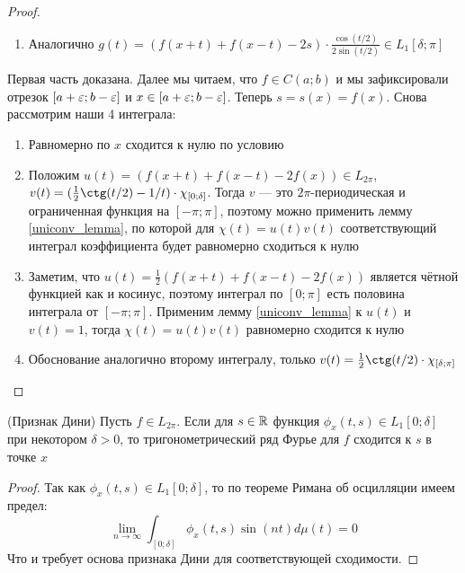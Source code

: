 \begin{proof}
\begin{enumerate}
 		\item Аналогично $g(t) = (f(x + t) + f(x - t) - 2s) \cdot \frac{\cos(t / 2)}{2\sin(t / 2)} \in L_1[\delta; \pi]$
 	\end{enumerate}
    Первая часть доказана. Далее мы читаем, что $f \in C(a; b)$ и мы зафиксировали отрезок $[a + \varepsilon; b - \varepsilon]$ и $x \in [a + \varepsilon; b - \varepsilon]$. Теперь $s = s(x) = f(x)$. Снова рассмотрим наши 4 интеграла:
    
    \begin{enumerate}
    	\item Равномерно по $x$ сходится к нулю по условию
    	
    	\item Положим $u(t) = (f(x + t) + f(x - t) - 2f(x)) \in L_{2\pi}$, $v(t) = (\frac{1}{2}\ctg(t / 2) - 1 / t) \cdot \chi_{[0; \delta]}$. Тогда $v$ --- это $2\pi$-периодическая и ограниченная функция на $[-\pi; \pi]$, поэтому можно применить лемму \ref{uniconv_lemma}, по которой для $\chi(t) = u(t)v(t)$ соответствующий интеграл коэффициента будет равномерно сходиться к нулю
    	
    	\item Заметим, что $u(t) = \frac{1}{2}(f(x + t) + f(x - t) - 2f(x))$ является чётной функцией как и косинус, поэтому интеграл по $[0; \pi]$ есть половина интеграла от $[-\pi; \pi]$. Применим лемму \ref{uniconv_lemma} к $u(t)$ и $v(t) = 1$, тогда $\chi(t) = u(t)v(t)$ равномерно сходится к нулю
    	
    	\item Обоснование аналогично второму интегралу, только $v(t) = \frac{1}{2}\ctg(t / 2) \cdot \chi_{[\delta; \pi]}$
    \end{enumerate}
\end{proof}

\begin{theorem} (Признак Дини)
	Пусть $f \in L_{2\pi}$. Если для $s \in \mathbb{R}$ функция $\phi_x(t, s) \in L_1[0; \delta]$ при некотором $\delta > 0$, то тригонометрический ряд Фурье для $f$ сходится к $s$ в точке $x$
\end{theorem}

\begin{proof}
	Так как $\phi_x(t, s) \in L_1[0; \delta]$, то по теореме Римана об осцилляции имеем предел:
	\[
		\lim_{n \to \infty} \int_{[0; \delta]} \phi_x(t, s)\sin(nt)d\mu(t) = 0
	\]
	Что и требует основа признака Дини для соответствующей сходимости.
\end{proof}